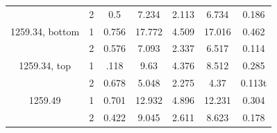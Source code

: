 \begin{table}[H]
\begin{tabular}{c c c c c c c}
~       & 2 & 0.5 & 7.234 & 2.113 & 6.734 & 0.186 \\
1259.34, bottom & 1 & 0.756 & 17.772 & 4.509 & 17.016 & 0.462 \\
~       & 2 & 0.576 & 7.093 & 2.337 & 6.517 & 0.114 \\
1259.34, top & 1 & .118 & 9.63 & 4.376 & 8.512 & 0.285 \\
~       & 2 & 0.678 & 5.048 & 2.275 & 4.37 & 0.113t \\
1259.49 & 1 & 0.701 & 12.932 & 4.896 & 12.231 & 0.304 \\
~       & 2 & 0.422 & 9.045 & 2.611 & 8.623 & 0.178 \\
\bottomrule
\end{tabular}
\end{table}








